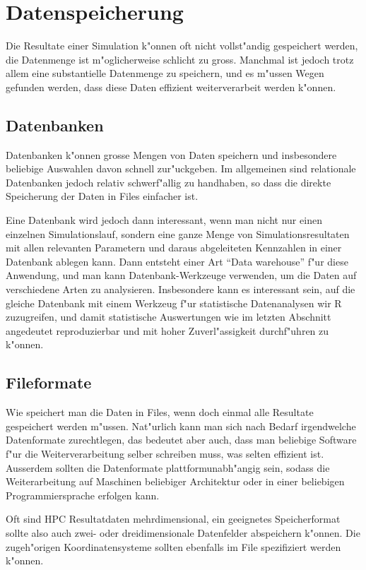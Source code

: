 \section{Datenspeicherung}
Die Resultate einer Simulation k"onnen oft nicht vollst"andig gespeichert
werden, die Datenmenge ist m"oglicherweise schlicht zu gross.
Manchmal ist jedoch trotz allem eine substantielle Datenmenge zu
speichern, und es m"ussen Wegen gefunden werden, dass diese Daten
effizient weiterverarbeit werden k"onnen.

\subsection{Datenbanken}
Datenbanken k"onnen grosse Mengen von Daten speichern und insbesondere
beliebige Auswahlen davon schnell zur"uckgeben.
Im allgemeinen sind relationale Datenbanken jedoch relativ 
schwerf"allig zu handhaben, so dass die direkte Speicherung
der Daten in Files einfacher ist.

Eine Datenbank wird jedoch dann interessant, wenn man nicht nur einen
einzelnen Simulationslauf, sondern eine ganze Menge von Simulationsresultaten
mit allen relevanten Parametern und daraus abgeleiteten Kennzahlen
in einer Datenbank ablegen kann.
Dann entsteht einer Art ``Data warehouse'' f"ur diese Anwendung,
und man kann Datenbank-Werkzeuge verwenden, um die Daten auf
verschiedene Arten zu analysieren. 
Insbesondere kann es interessant sein, auf die gleiche Datenbank
mit einem Werkzeug f"ur statistische Datenanalysen wir R zuzugreifen,
und damit statistische Auswertungen wie im letzten Abschnitt
angedeutet reproduzierbar und mit hoher Zuverl"assigkeit durchf"uhren
zu k"onnen.

\subsection{Fileformate}
Wie speichert man die Daten in Files, wenn doch einmal alle Resultate
gespeichert werden m"ussen.
Nat"urlich kann man sich nach Bedarf irgendwelche Datenformate zurechtlegen,
das bedeutet aber auch, dass man beliebige Software f"ur die
Weiterverarbeitung selber schreiben muss, was selten effizient ist.
Ausserdem sollten die Datenformate plattformunabh"angig sein,
sodass die Weiterarbeitung auf Maschinen beliebiger Architektur
oder in einer beliebigen Programmiersprache erfolgen kann.

Oft sind HPC Resultatdaten mehrdimensional, ein geeignetes Speicherformat
sollte also auch zwei- oder dreidimensionale Datenfelder abspeichern
k"onnen.
Die zugeh"origen Koordinatensysteme sollten ebenfalls im File
spezifiziert werden k"onnen.

